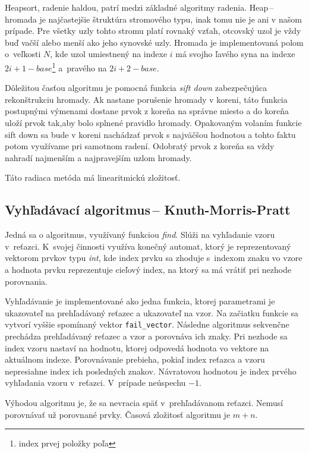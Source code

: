 \documentclass[11pt,a4paper]{article}
\begin{document}
	Heapsort, radenie haldou, patrí medzi základné algoritmy radenia. Heap\,--\,hromada je
	najčastejšie štruktúra stromového typu, inak tomu nie je ani v našom prípade.
	Pre všetky uzly tohto stromu platí rovnaký vzťah, otcovský uzol je vždy buď
	vačší alebo menší ako jeho synovské uzly. Hromada je implementovaná polom o~veľkosti $N$,
	kde uzol umiestnený na indexe $i$ má svojho ľavého syna na indexe
	$2i+1-base$\footnote{index prvej položky poľa} a~pravého na $2i+2-base$.

	Dôležitou časťou algoritmu je pomocná funkcia \textit{sift down} zabezpečujúca rekonštrukciu hromady. Ak nastane porušenie hromady v koreni, táto funkcia postupnými výmenami dostane prvok z koreňa na správne miesto a do koreňa uloží prvok tak,aby bolo splnené pravidlo hromady. Opakovaným volaním funkcie sift down sa bude v koreni nachádzať prvok s najväčšou hodnotou a tohto faktu potom využívame pri samotnom radení. Odobratý prvok z koreňa sa vždy nahradí najmenším a najpravejším uzlom hromady.

	Táto radiaca metóda má linearitmickú zložitosť.

	\subsection{Vyhľadávací algoritmus\,-- Knuth-Morris-Pratt}

	Jedná sa o algoritmus, využívaný funkciou \textit{find}. Slúži na vyhľadanie vzoru v~reťazci. K~svojej činnosti využíva konečný automat, ktorý je reprezentovaný vektorom prvkov typu \textit{int}, kde index prvku sa zhoduje s~indexom znaku vo vzore a hodnota prvku reprezentuje cieľový index, na ktorý sa má vrátiť pri nezhode porovnania.

	Vyhľadávanie je implementované ako jedna funkcia, ktorej parametrami je ukazovateľ na prehľadávaný reťazec a ukazovateľ na vzor. Na začiatku funkcie sa vytvorí vyššie spomínaný vektor \texttt{fail\_vector}. Následne algoritmus sekvenčne prechádza prehľadávaný reťazec a vzor a porovnáva ich znaky. Pri nezhode sa index vzoru nastaví na hodnotu, ktorej odpovedá hodnota vo vektore na aktuálnom indexe. Porovnávanie prebieha, pokiaľ index reťazca a vzoru nepresiahne	index ich posledných znakov. Návratovou hodnotou je index prvého vyhľadania vzoru v~reťazci. V~prípade neúspechu $-1$.

	Výhodou algoritmu je, že sa nevracia späť v~prehľadávanom reťazci. Nemusí porovnávať už porovnané prvky. Časová zložitosť algoritmu je ${m+n}$.
\end{document}
